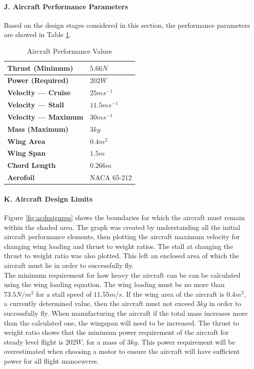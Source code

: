 \documentclass[12pt]{article}
\begin{document}
\paragraph{J. Aircraft Performance Parameters} Based on the design stages considered in this section, the performance parameters are showed in Table \ref{thing}. 

\begin{table}[h!]
\centering
\begin{tabular}{|l|l|}
\hline
\textbf{Thrust (Minimum)} & $5.66N$
\\ \hline \textbf{Power (Required)} & $202W$ 
\\ \hline \textbf{Velocity --- Cruise} & $25ms{{^-}^1}$ 
\\ \hline \textbf{Velocity --- Stall} & $11.5ms{{^-}^1}$ 
\\ \hline \textbf{Velocity --- Maximum } & $30ms{{^-}^1}$ 
\\ \hline \textbf{Mass (Maximum)} & $3kg$ 
\\ \hline \textbf{Wing Area} & $0.4m^2$ 
\\ \hline \textbf{Wing Span} & $1.5m$ 
\\ \hline \textbf{Chord Length} & $0.266m$ 
\\ \hline \textbf{Aerofoil} & NACA 65-212 
\\ \hline
\end{tabular}
\caption{Aircraft Performance Values}
\label{thing}
\end{table}

\paragraph{K. Aircraft Design Limits} Figure \ref{fig:acdesignreq} shows the boundaries for which the aircraft must remain within the shaded area. The graph was created by understanding all the initial aircraft performance elements, then plotting the aircraft maximum velocity for changing wing loading and thrust to weight ratios. The stall at changing the thrust to weight ratio was also plotted. This left an enclosed area of which the aircraft must lie in order to successfully fly. \\

\noindent The minimum requirement for how heavy the aircraft can be can be calculated using the wing loading equation. The wing loading must be no more than $73.5 N/m^2$ for a stall speed of $11.55m/s$. If the wing area of the aircraft is $0.4m^2$, a currently determined value, then the aircraft must not exceed $3kg$ in order to successfully fly. When manufacturing the aircraft if the total mass increases more than the calculated one, the wingspan will need to be increased. The thrust to weight ratio shows that the minimum power requirement of the aircraft for steady level flight is $202W$, for a mass of $3kg$. This power requirement will be overestimated when choosing a motor to ensure the aircraft will have sufficient power for all flight manoeuvres. \\
\end{document}
